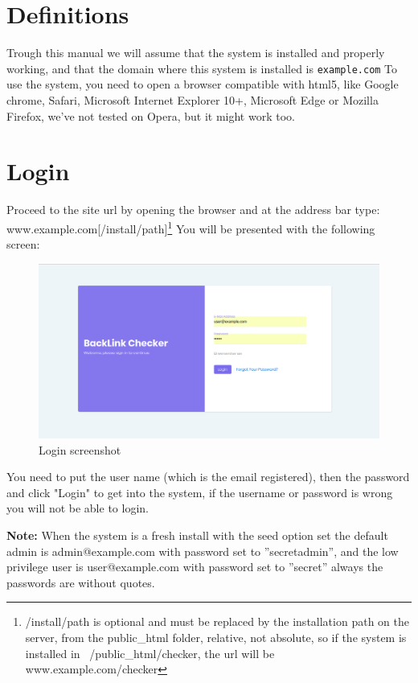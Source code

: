 \tableofcontents

\section{Definitions}
Trough this manual we will assume that the system is installed and properly working, and that the domain where this system is installed is \verb|example.com|
To use the system, you need to open a browser compatible with html5, like Google chrome, Safari, Microsoft Internet Explorer 10+, Microsoft Edge or Mozilla Firefox, we've not tested on Opera, but it might work too.

\section{Login}
Proceed to the site url by opening the browser and at the address bar type: www.example.com[/install/path]\footnote{/install/path is optional and must be replaced by the installation path on the server, from the public\_html folder, relative, not absolute, so if the system is installed in ~/public\_html/checker, the url will be www.example.com/checker}
You will be presented with the following screen:

\begin{figure}[ht!]
	\caption{Login screenshot}
	\label{img:login}
	\includegraphics[width=\textwidth]{images/login_screenshot}
\end{figure}

You need to put the user name (which is the email registered), then the password and click "Login" to get into the system, if the username or password is wrong you will not be able to login.

\textbf{Note:} When the system is a fresh install with the seed option set the default admin is admin@example.com with password set to ''secretadmin'', and the low privilege user is user@example.com with password set to ''secret'' always the passwords are without quotes.

